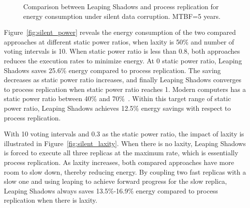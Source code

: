 {\begin{figure}[!t]
\begin{center}
{		}
	\end{center}
	\caption{Comparison between Leaping Shadows and process replication for energy consumption under silent data corruption. MTBF=5 years.}
	\label{fig:silent_eval}
\end{figure}

\clearpage
}

Figure~\ref{fig:silent_power} reveals the energy consumption of the two compared approaches at different static power ratios, when laxity is 50\% and number of voting intervals is 10. When static power ratio is less than 0.8, both approaches reduces the execution rates to minimize energy. At 0 static power ratio, Leaping Shadows saves 25.6\% energy compared to process replication. The saving decreases as static power ratio increases, and finally Leaping Shadows converges to process replication when static power ratio reaches 1. Modern computers has a static power ratio between 40\% and 70\%~\cite{butts2000static}. Within this target range of static power ratio, Leaping Shadows achieves 12.5\% energy savings with respect to process replication.

With 10 voting intervals and 0.3 as the static power ratio, the impact of laxity is illustrated in Figure~\ref{fig:silent_laxity}. When there is no laxity, Leaping Shadows is forced to execute all three replicas at the maximum rate, which is essentially process replication. As laxity increases, both compared approaches have more room to slow down, thereby reducing energy. By coupling two fast replicas with a slow one and using leaping to achieve forward progress for the slow replica, Leaping Shadows always saves 13.5\%-16.9\% energy compared to process replication when there is laxity.


